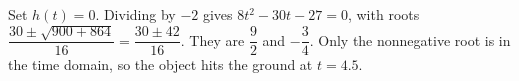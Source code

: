 Set $h(t)=0$. Dividing by $-2$ gives $8t^2-30t-27=0$, with roots $\dfrac{30\pm\sqrt{900+864}}{16}=\dfrac{30\pm42}{16}$. They are $\dfrac{9}{2}$ and $-\dfrac{3}{4}$. Only the nonnegative root is in the time domain, so the object hits the ground at $\boxed{t=4.5}$.

